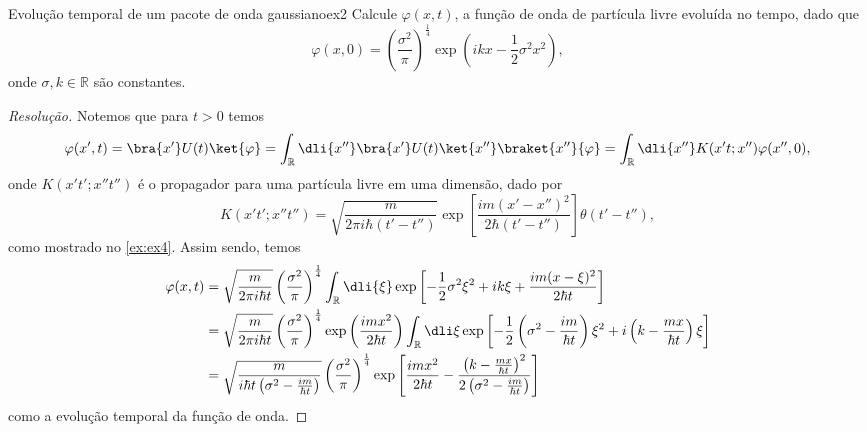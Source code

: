 \begin{exercício}{Evolução temporal de um pacote de onda gaussiano}{ex2}
   Calcule \(\varphi(x,t)\), a função de onda de partícula livre evoluída no tempo, dado que
   \begin{equation*}
      \varphi(x,0) = \left(\frac{\sigma^2}{\pi}\right)^{\frac14}\exp\left(ikx - \frac12 \sigma^2 x^2\right),
   \end{equation*}
   onde \(\sigma, k \in \mathbb{R}\) são constantes.
\end{exercício}
\begin{proof}[Resolução]
   Notemos que para \(t > 0\) temos
   \begin{equation*}
      \varphi(x', t) = \bra{x'} U(t) \ket{\varphi} = \int_{\mathbb{R}} \dli{x''} \bra{x'} U(t) \ket{x''} \braket{x''}{\varphi} = \int_{\mathbb{R}} \dli{x''} K(x't; x'') \varphi(x'', 0),
   \end{equation*}
   onde \(K(x't'; x'' t'')\) é o propagador para uma partícula livre em uma dimensão, dado por
   \begin{equation*}
      K(x't'; x'' t'') = \sqrt{\frac{m}{2\pi i \hbar (t' - t'')}} \exp\left[\frac{im (x' - x'')^2}{2 \hbar (t' - t'')}\right] \theta(t' - t''),
   \end{equation*}
   como mostrado no \cref{ex:ex4}. Assim sendo, temos
   \begin{align*}
      \varphi(x, t) &= \sqrt{\frac{m}{2\pi i \hbar t}} \left(\frac{\sigma^2}{\pi}\right)^{\frac14}\int_{\mathbb{R}} \dli{\xi} \exp\left[-\frac12 \sigma^2 \xi^2 + ik\xi + \frac{i m (x - \xi)^2}{2 \hbar t}\right]\\
                    &= \sqrt{\frac{m}{2\pi i \hbar t}} \left(\frac{\sigma^2}{\pi}\right)^{\frac14}\exp\left(\frac{im x^2}{ 2 \hbar t}\right) \int_{\mathbb{R}} \dli\xi \exp\left[- \frac12\left(\sigma^2 - \frac{im}{\hbar t}\right)\xi^2 + i\left(k - \frac{mx}{\hbar t}\right)\xi\right]\\
                    &= \sqrt{\frac{m}{i \hbar t\left(\sigma^2 - \frac{im}{\hbar t}\right)}} \left(\frac{\sigma^2}{\pi}\right)^{\frac14}\exp\left[\frac{im x^2}{ 2 \hbar t} - \frac{\left(k - \frac{mx}{\hbar t}\right)^2}{2\left(\sigma^2 - \frac{im}{\hbar t}\right)}\right]
   \end{align*}
   como a evolução temporal da função de onda.
\end{proof}
